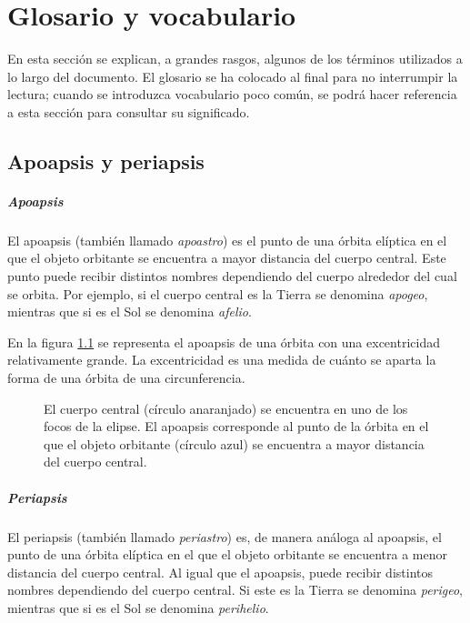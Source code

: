 \chapter{Glosario y vocabulario}\label{chpt:glosario}

En esta sección se explican, a grandes rasgos, algunos de los términos utilizados a lo largo del documento. El glosario se ha colocado al final para no interrumpir la lectura; cuando se introduzca vocabulario poco común, se podrá hacer referencia a esta sección para consultar su significado.

\section{Apoapsis y periapsis}

\paragraph{Apoapsis}
El apoapsis (también llamado \emph{apoastro}) es el punto de una órbita elíptica en el que el objeto orbitante se encuentra a mayor distancia del cuerpo central. Este punto puede recibir distintos nombres dependiendo del cuerpo alrededor del cual se orbita. Por ejemplo, si el cuerpo central es la Tierra se denomina \emph{apogeo}, mientras que si es el Sol se denomina \emph{afelio}.

En la figura \ref{fig_apoapsis} se representa el apoapsis de una órbita con una excentricidad relativamente grande. La excentricidad es una medida de cuánto se aparta la forma de una órbita de una circunferencia. 

\begin{figure}[!ht]
  \centering
  \caption{El cuerpo central (círculo anaranjado) se encuentra en uno de los
  focos de la elipse. El apoapsis corresponde al punto de la órbita en el que
  el objeto orbitante (círculo azul) se encuentra a mayor distancia del cuerpo
  central.}
  \label{fig_apoapsis}
\end{figure}

\paragraph{Periapsis}
El periapsis (también llamado \emph{periastro}) es, de manera análoga al apoapsis, el punto de una órbita elíptica en el que el objeto orbitante se encuentra a menor distancia del cuerpo central. Al igual que el apoapsis, puede recibir distintos nombres dependiendo del cuerpo central. Si este es la Tierra se denomina \emph{perigeo}, mientras que si es el Sol se denomina \emph{perihelio}.

